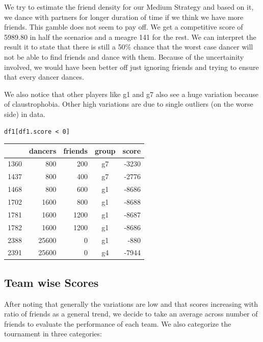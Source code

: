 We try to estimate the friend density for our Medium Strategy and based
on it, we dance with partners for longer duration of time if we think we
have more friends. This gamble does not seem to pay off. We get a
competitive score of 5989.80 in half the scenarios and a meagre 141 for
the rest. We can interpret the result it to state that there is still a
50\% chance that the worst case dancer will not be able to find friends
and dance with them. Because of the uncertainity involved, we would have
been better off just ignoring friends and trying to ensure that every
dancer dances.

We also notice that other players like g1 and g7 also see a huge
variation because of claustrophobia. Other high variations are due to
single outliers (on the worse side) in data.

\begin{verbatim}
df1[df1.score < 0]
\end{verbatim}

\begin{longtable}[c]{@{}lrrcr@{}}
\toprule
& dancers & friends & group & score\tabularnewline
\midrule
\endhead
1360 & 800 & 200 & g7 & -3230\tabularnewline
1437 & 800 & 400 & g7 & -2776\tabularnewline
1468 & 800 & 600 & g1 & -8686\tabularnewline
1702 & 1600 & 800 & g1 & -8688\tabularnewline
1781 & 1600 & 1200 & g1 & -8687\tabularnewline
1782 & 1600 & 1200 & g1 & -8686\tabularnewline
2388 & 25600 & 0 & g1 & -880\tabularnewline
2391 & 25600 & 0 & g4 & -7944\tabularnewline
\bottomrule
\end{longtable}

\subsection{Team wise Scores}\label{team-wise-scores}

After noting that generally the variations are low and that scores
increasing with ratio of friends as a general trend, we decide to take
an average across number of friends to evaluate the performance of each
team. We also categorize the tournament in three categories:


